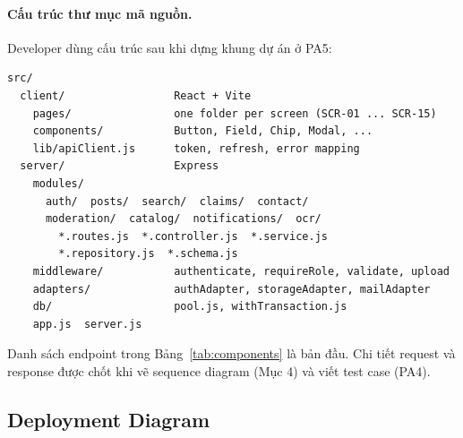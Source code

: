 \paragraph{Cấu trúc thư mục mã nguồn.} Developer dùng cấu trúc sau khi dựng khung dự án ở PA5:
\begin{verbatim}
src/
  client/                 React + Vite
    pages/                one folder per screen (SCR-01 ... SCR-15)
    components/           Button, Field, Chip, Modal, ...
    lib/apiClient.js      token, refresh, error mapping
  server/                 Express
    modules/
      auth/  posts/  search/  claims/  contact/
      moderation/  catalog/  notifications/  ocr/
        *.routes.js  *.controller.js  *.service.js
        *.repository.js  *.schema.js
    middleware/           authenticate, requireRole, validate, upload
    adapters/             authAdapter, storageAdapter, mailAdapter
    db/                   pool.js, withTransaction.js
    app.js  server.js
\end{verbatim}

Danh sách endpoint trong Bảng~\ref{tab:components} là bản đầu. Chi tiết request và response được chốt khi vẽ sequence diagram (Mục 4) và viết test case (PA4).

\subsection{Deployment Diagram}


